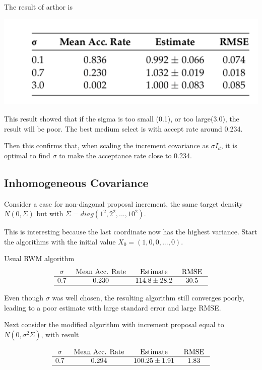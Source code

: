 \documentclass[
]{book}
\theoremstyle{definition}
\theoremstyle{definition}
\theoremstyle{definition}
\theoremstyle{remark}
\begin{document}
The result of arthor is

\includegraphics{pic/MHAtable.png}

This result showed that if the sigma is too small (0.1), or too large(3.0), the result will be poor. The best medium select is with accept rate around 0.234.

Then this confirms that, when scaling the increment covariance as \(\sigma I_d\), it is optimal to find \(\sigma\) to make the acceptance rate close to 0.234.

\hypertarget{inhomogeneous-covariance}{%
\subsection{Inhomogeneous Covariance}\label{inhomogeneous-covariance}}

Consider a case for non-diagonal proposal increment, the same target density \(N(0,\Sigma)\) but with \(\Sigma=diag(1^2,2^2,...,10^2)\).

This is interesting because the last coordinate now has the highest variance. Start the algorithms with the initial value \(X_0=(1,0,0,...,0)\).

Usual RWM algorithm
\[
\begin{array}{cccc}{\sigma} & {\text { Mean Acc. Rate }} & {\text { Estimate }} & {\text { RMSE }} \\ \hline 0.7 & {0.230} & {114.8 \pm 28.2} & {30.5} \\ \hline\end{array}
\]

Even though \(\sigma\) was well chosen, the resulting algorithm still converges poorly, leading to a poor estimate with large standard error and large RMSE.

Next consider the modified algorithm with increment proposal equal to \(N(0,\sigma^2\Sigma)\), with result

\[
\begin{array}{cccc}{\sigma} & {\text { Mean Acc. Rate }} & {\text { Estimate }} & {\text { RMSE }} \\ \hline 0.7 & {0.294} & {100.25 \pm 1.91} & {1.83} \\ \hline\end{array}
\]
\end{document}
